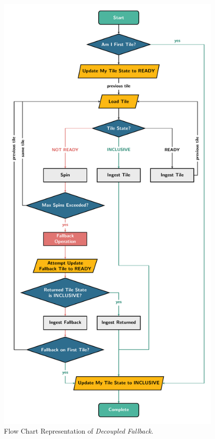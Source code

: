 \documentclass[sigconf,screen]{acmart}
\begin{document}
\begin{figure}
  \centering
  \includegraphics[width=\columnwidth]{graphics/FlowChart.pdf}
  \caption{Flow Chart Representation of \emph{Decoupled Fallback}.\label{fig:decoupled_fallback}}
\end{figure}
\end{document}
